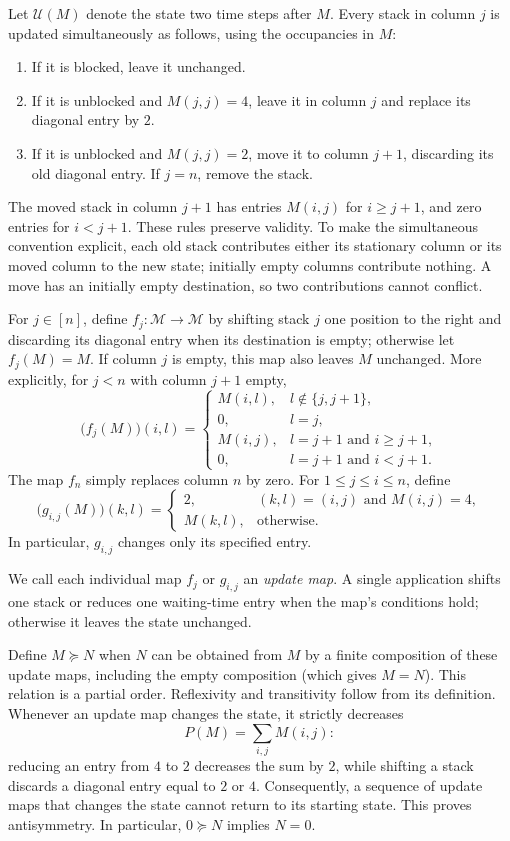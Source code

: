 \documentclass[reqno]{amsart}
\begin{document}
Let $\mathcal U(M)$ denote the state two time steps after $M$. Every
stack in column $j$ is updated simultaneously as follows, using the
occupancies in $M$:
\begin{enumerate}
\item If it is blocked, leave it unchanged.
\item If it is unblocked and $M(j,j)=4$, leave it in column $j$ and
replace its diagonal entry by $2$.
\item If it is unblocked and $M(j,j)=2$, move it to column $j+1$,
discarding its old diagonal entry. If $j=n$, remove the stack.
\end{enumerate}
The moved stack in column $j+1$ has entries $M(i,j)$ for $i\geq j+1$,
and zero entries for $i<j+1$. These rules preserve validity. To make the
simultaneous convention explicit, each old stack contributes either
its stationary column or its moved column to the new state; initially
empty columns contribute nothing. A move has an initially empty
destination, so two contributions cannot conflict.

For $j\in[n]$, define $f_j:\mathcal M\to\mathcal M$ by shifting stack
$j$ one position to the right and discarding its diagonal entry when
its destination is empty; otherwise let $f_j(M)=M$. If column $j$ is
empty, this map also leaves $M$ unchanged. More explicitly, for $j<n$
with column $j+1$ empty,
\[
\bigl(f_j(M)\bigr)(i,l)=
\begin{cases}
 M(i,l),&l\notin\{j,j+1\},\\
 0,&l=j,\\
 M(i,j),&l=j+1\text{ and }i\geq j+1,\\
 0,&l=j+1\text{ and }i<j+1.
\end{cases}
\]
The map $f_n$ simply replaces column $n$ by zero. For
$1\leq j\leq i\leq n$, define
\[
\bigl(g_{i,j}(M)\bigr)(k,l)=
\begin{cases}
 2,&(k,l)=(i,j)\text{ and }M(i,j)=4,\\
 M(k,l),&\text{otherwise}.
\end{cases}
\]
In particular, $g_{i,j}$ changes only its specified entry.

We call each individual map $f_j$ or $g_{i,j}$ an \emph{update map}. A single
application shifts one stack or reduces one waiting-time entry when the
map's conditions hold; otherwise it leaves the state unchanged.

Define $M\succeq N$ when $N$ can be obtained from $M$ by a finite
composition of these update maps, including the empty composition
(which gives $M=N$).
This relation is a partial order. Reflexivity and transitivity follow
from its definition. Whenever an update map changes the state, it
strictly decreases
\[
    P(M)=\sum_{i,j}M(i,j):
\]
reducing an entry from $4$ to $2$ decreases the sum by $2$, while shifting
a stack discards a diagonal entry equal to $2$ or $4$. Consequently, a
sequence of update maps that changes the state cannot return to its
starting state. This proves antisymmetry. In particular,
$0\succeq N$ implies $N=0$.
\end{document}
